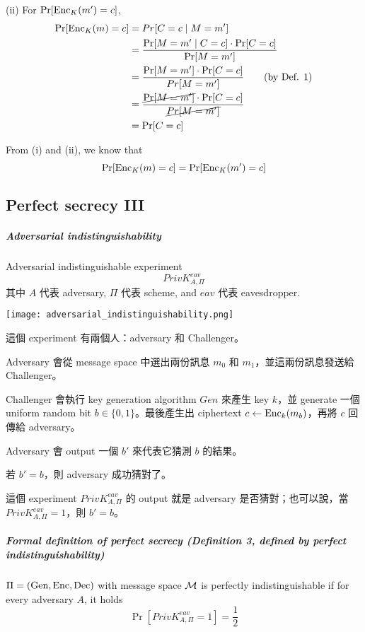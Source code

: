 (ii) For \(\Pr[\operatorname{Enc}_K(m') = c]\),
\begin{align*}
	\Pr[\operatorname{Enc}_K(m) = c] &= Pr[C = c \mid M = m']\\
	&= \frac{\Pr[M = m' \mid C = c] \cdot \Pr[C = c]}{\Pr[M = m']} \\
	&= \frac{\Pr[M = m'] \cdot \Pr[C =c]}{Pr[M = m']} \tag{by Def. 1} \\
	&= \frac{\cancel{\Pr[M = m']} \cdot \Pr[C = c]}{\cancel{Pr[M = m']}} \\
	&= \Pr[C = c]
\end{align*}

From (i) and (ii), we know that
\[ \Pr[\operatorname{Enc}_K(m) = c] = \Pr[\operatorname{Enc}_K(m') = c] \]


\subsection{Perfect secrecy III}

\subparagraph{Adversarial indistinguishability}

Adversarial indistinguishable experiment
\[PrivK_{A, \Pi}^{eav}\]
其中 \(A\) 代表 adversary, \(\Pi\) 代表 scheme, and \(eav\) 代表 eavesdropper.

\texttt{[image: adversarial\_indistinguishability.png]}

這個 experiment 有兩個人：adversary 和 Challenger。
\begin{steps}
	\item Adversary 會從 message space 中選出兩份訊息 \(m_0\) 和 \(m_1\)，並這兩份訊息發送給 Challenger。
	\item Challenger 會執行 key generation algorithm \(Gen\) 來產生 key \(k\)，並 generate 一個 uniform random bit \(b \in \{0,1\}\)。最後產生出 ciphertext \(c \leftarrow \operatorname{Enc}_k(m_b)\)，再將 \(c\) 回傳給 adversary。
	\item Adversary 會 output 一個 \(b'\) 來代表它猜測 \(b\) 的結果。
	\item 若 \(b' = b\)，則 adversary 成功猜對了。
\end{steps}

這個 experiment \(PrivK_{A, \Pi}^{eav}\) 的 output 就是 adversary 是否猜對；也可以說，當 \(PrivK_{A, \Pi}^{eav} = 1\)，則 \(b' = b\)。


\subparagraph{Formal definition of perfect secrecy (\textbf{Definition 3, defined by perfect indistinguishability})}

\(\Pi = (\operatorname{Gen}, \operatorname{Enc}, \operatorname{Dec})\) with message space \(\operatorname{\mathcal{M}}\) is perfectly indistinguishable if for every adversary \(A\), it holds
\[\Pr[PrivK_{A, \Pi}^{eav} = 1] = \frac{1}{2}\]

